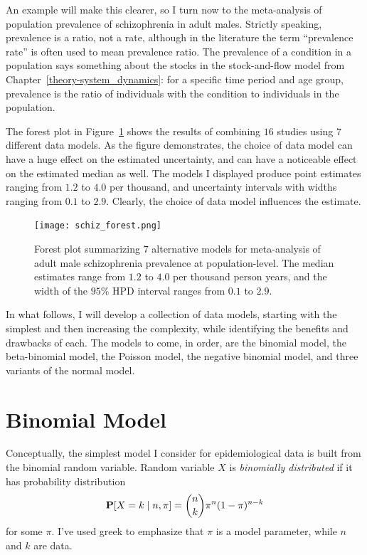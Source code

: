 An example will make this clearer, so I turn now to the meta-analysis
of population prevalence of schizophrenia in adult males.  Strictly
speaking, prevalence is a ratio, not a rate, although in the
literature the term ``prevalence rate'' is often used to mean
prevalence ratio.  The prevalence of a condition in a population says
something about the stocks in the stock-and-flow model from
Chapter~\ref{theory-system_dynamics}: for a specific time period and
age group, prevalence is the ratio of individuals with the condition
to individuals in the population.

The forest plot in Figure~\ref{rate-model-schiz-forest} shows the
results of combining $16$ studies using $7$ different data models.  As
the figure demonstrates, the choice of data model can have a huge
effect on the estimated uncertainty, and can have a noticeable effect
on the estimated median as well. The models I displayed produce point
estimates ranging from $1.2$ to $4.0$ per thousand, and uncertainty
intervals with widths ranging from $0.1$ to $2.9$.  Clearly, the
choice of data model influences the estimate.

\begin{figure}[h]
\begin{center}
\texttt{[image: schiz\_forest.png]}
\caption{Forest plot summarizing $7$ alternative models for
  meta-analysis of adult male schizophrenia prevalence at
  population-level.  The median estimates range from
  $1.2$ to
  $4.0$ per thousand person years, and the width of the
  $95\%$ HPD interval ranges from
  $0.1$ to
  $2.9$.}
\label{rate-model-schiz-forest}
\end{center}
\end{figure}

In what follows, I will develop a collection of data models, starting
with the simplest and then increasing the complexity, while
identifying the benefits and drawbacks of each.  The models to come,
in order, are the binomial model, the beta-binomial model, the Poisson
model, the negative binomial model, and three variants of the normal
model.

\section{Binomial Model}
Conceptually, the simplest model I consider for epidemiological data
is built from the binomial random variable. Random variable $X$ is
\emph{binomially distributed} if it has probability distribution
\[
\mathbf{P}[X=k\;|\; n, \pi] = \binom{n}{k}\pi^n(1-\pi)^{n-k}
\]
for some $\pi$.  I've used greek to emphasize that $\pi$ is a model
parameter, while $n$ and $k$ are data.

